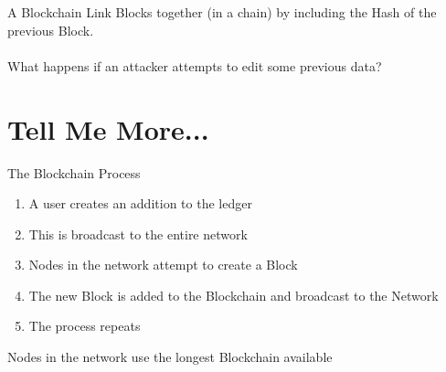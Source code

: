 \documentclass{beamer}
\begin{document}
\begin{frame}{A Blockchain}
Link Blocks together (in a chain) by including the Hash of the previous Block.\\
\\
\pause
What happens if an attacker attempts to edit some previous data?
\end{frame}


\section{Tell Me More...}


\begin{frame}{The Blockchain Process}
\begin{enumerate}
  \item A user creates an addition to the ledger \pause
  \item This is broadcast to the entire network \pause
  \item Nodes in the network attempt to create a Block \pause
  \item The new Block is added to the Blockchain and broadcast to the Network \pause
  \item The process repeats \pause
\end{enumerate}

\alert{Nodes in the network use the longest Blockchain available}
\end{frame}
\end{document}
